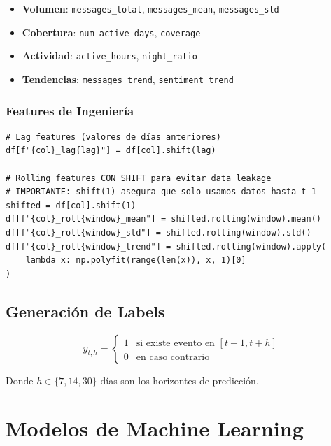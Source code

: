 \documentclass[11pt,a4paper]{article}
\begin{document}
\begin{itemize}
    \item \textbf{Volumen}: \texttt{messages\_total}, \texttt{messages\_mean}, \texttt{messages\_std}
    \item \textbf{Cobertura}: \texttt{num\_active\_days}, \texttt{coverage}
    \item \textbf{Actividad}: \texttt{active\_hours}, \texttt{night\_ratio}
    \item \textbf{Tendencias}: \texttt{messages\_trend}, \texttt{sentiment\_trend}
\end{itemize}

\subsubsection{Features de Ingeniería}

\begin{lstlisting}[caption={Feature Engineering con prevención de leakage}]
# Lag features (valores de días anteriores)
df[f"{col}_lag{lag}"] = df[col].shift(lag)

# Rolling features CON SHIFT para evitar data leakage
# IMPORTANTE: shift(1) asegura que solo usamos datos hasta t-1
shifted = df[col].shift(1)
df[f"{col}_roll{window}_mean"] = shifted.rolling(window).mean()
df[f"{col}_roll{window}_std"] = shifted.rolling(window).std()
df[f"{col}_roll{window}_trend"] = shifted.rolling(window).apply(
    lambda x: np.polyfit(range(len(x)), x, 1)[0]
)
\end{lstlisting}

\subsection{Generación de Labels}

\begin{equation}
y_{t,h} = \begin{cases}
1 & \text{si existe evento en } [t+1, t+h] \\
0 & \text{en caso contrario}
\end{cases}
\end{equation}

Donde $h \in \{7, 14, 30\}$ días son los horizontes de predicción.

\section{Modelos de Machine Learning}
\end{document}
